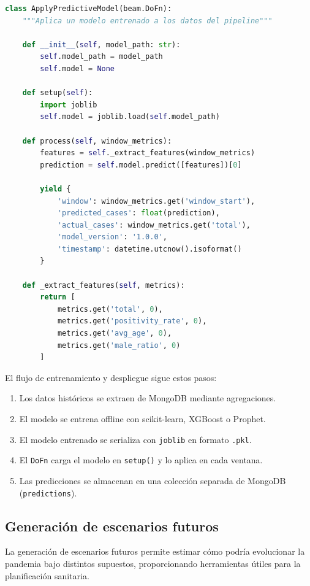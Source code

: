\documentclass[12pt,a4paper]{article}
\begin{document}
\begin{lstlisting}[language=Python, caption=DoFn para aplicar modelo predictivo en el pipeline]
class ApplyPredictiveModel(beam.DoFn):
    """Aplica un modelo entrenado a los datos del pipeline"""

    def __init__(self, model_path: str):
        self.model_path = model_path
        self.model = None

    def setup(self):
        import joblib
        self.model = joblib.load(self.model_path)

    def process(self, window_metrics):
        features = self._extract_features(window_metrics)
        prediction = self.model.predict([features])[0]

        yield {
            'window': window_metrics.get('window_start'),
            'predicted_cases': float(prediction),
            'actual_cases': window_metrics.get('total'),
            'model_version': '1.0.0',
            'timestamp': datetime.utcnow().isoformat()
        }

    def _extract_features(self, metrics):
        return [
            metrics.get('total', 0),
            metrics.get('positivity_rate', 0),
            metrics.get('avg_age', 0),
            metrics.get('male_ratio', 0)
        ]
\end{lstlisting}

El flujo de entrenamiento y despliegue sigue estos pasos:

\begin{enumerate}
    \item Los datos históricos se extraen de MongoDB mediante agregaciones.
    \item El modelo se entrena offline con scikit-learn, XGBoost o Prophet.
    \item El modelo entrenado se serializa con \texttt{joblib} en formato \texttt{.pkl}.
    \item El \texttt{DoFn} carga el modelo en \texttt{setup()} y lo aplica en cada ventana.
    \item Las predicciones se almacenan en una colección separada de MongoDB (\texttt{predictions}).
\end{enumerate}

\subsection{Generación de escenarios futuros}\label{generaciuxf3n-de-escenarios-futuros}

La generación de escenarios futuros permite estimar cómo podría evolucionar la pandemia bajo distintos supuestos, proporcionando herramientas útiles para la planificación sanitaria.
\end{document}
